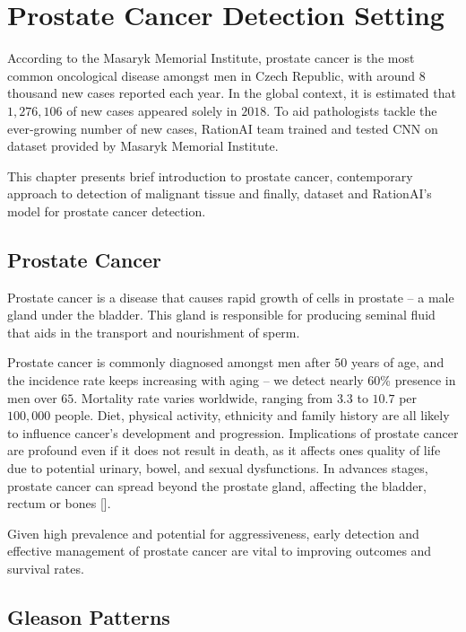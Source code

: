 \chapter{Prostate Cancer Detection Setting}

According to the Masaryk Memorial Institute, prostate cancer is the most common oncological disease amongst men in Czech Republic, with around $8$ thousand new cases reported each year. In the global context, it is estimated that $1,276,106$ of new cases appeared solely in $2018$. To aid pathologists tackle the ever-growing number of new cases, RationAI team trained and tested CNN on dataset provided by Masaryk Memorial Institute.

This chapter presents brief introduction to prostate cancer, contemporary approach to detection of malignant tissue and finally, dataset and RationAI's model for prostate cancer detection.

\section{Prostate Cancer}

Prostate cancer is a disease that causes rapid growth of cells in prostate -- a male gland under the bladder. This gland is responsible for producing seminal fluid that aids in the transport and nourishment of sperm.


Prostate cancer is commonly diagnosed amongst men after $50$ years of age, and the incidence rate keeps increasing with aging -- we detect nearly $60$\% presence in men over $65$. Mortality rate varies worldwide, ranging from $3.3$ to $10.7$ per $100,000$ people. Diet, physical activity, ethnicity and family history are all likely to influence cancer's development and progression. Implications of prostate cancer are profound even if it does not result in death, as it affects ones quality of life due to potential urinary, bowel, and sexual dysfunctions. In advances stages, prostate cancer can spread beyond the prostate gland, affecting the bladder, rectum or bones [].

Given high prevalence and potential for aggressiveness, early detection and effective management of prostate cancer are vital to improving outcomes and survival rates.

\section{Gleason Patterns}

